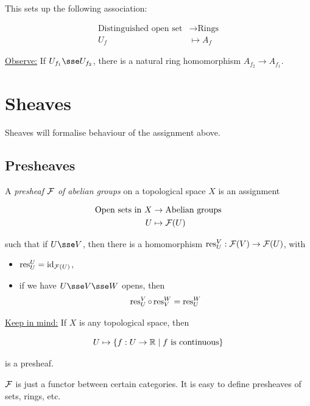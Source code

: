 \documentclass{article}
\begin{document}
This sets up the following association:

\begin{align*}
    \text{Distinguished open set} &\to \text{Rings} \\
    U_f &\mapsto A_f
\end{align*}

\underline{Observe:} If \(U_{f_1} \sse U_{f_2}\), there is a natural ring homomorphism \(A_{f_2} \to A_{f_1}\).

\section{Sheaves}

Sheaves will formalise behaviour of the assignment above.

\subsection{Presheaves}

\begin{definition}
    [presheaf]
    A \emph{presheaf \(\mathcal{F}\) of abelian groups} on a topological space \(X\) is an assignment

    \begin{align*}
        \text{Open sets in }X &\to \text{Abelian groups} \\
        U &\mapsto \mathcal{F}(U)
    \end{align*}

    such that if \(U \sse V\), then there is a homomorphism \(\operatorname{res}^V_U : \mathcal{F}(V) \to \mathcal{F}(U)\), with

    \begin{itemize}
        \item \(\operatorname{res}_U^U = \operatorname{id}_{\mathcal{F}(U)}\),
        \item if we have \(U \sse V \sse W\) opens, then
        \[\operatorname{res}_U^V \circ \operatorname{res}_V^W = \operatorname{res}_U^W\]
    \end{itemize}
\end{definition}

\underline{Keep in mind:} If \(X\) is any topological space, then

\[U \mapsto \left\{f : U \to \mathbb{R} \mid f \text{ is continuous}\right\}\]

is a presheaf.

\begin{remark}
    \(\mathcal{F}\) is just a functor between certain categories. It is easy to define presheaves of sets, rings, etc.
\end{remark}
\end{document}
